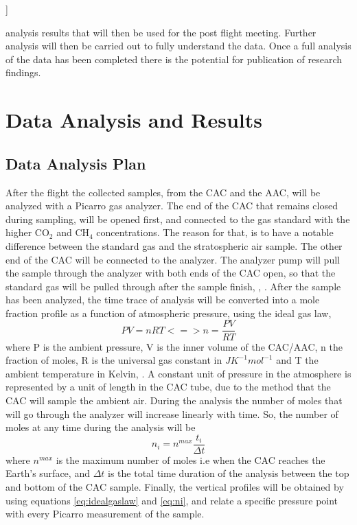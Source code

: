 ]\documentclass[a4paper,12pt,twoside]{article}
\providecommand{\DIFaddtex}[1]{{\protect\color{blue}\uwave{#1}}} %
\providecommand{\DIFaddend}{} %
\providecommand{\DIFadd}[1]{\texorpdfstring{\DIFaddtex{#1}}{#1}} %
\DeclareRobustCommand{\DIFaddend}{\DIFOaddend \let\includegraphics\DIFOincludegraphics} %
\begin{document}
\DIFadd{The }\DIFaddend analysis results that will then be used for the post flight meeting. Further analysis will then be carried out to fully understand the data. Once a full analysis of the data has been completed there is the potential for publication of research findings.



\pagebreak
\section{Data Analysis and Results}

\subsection{Data Analysis Plan}

After the flight the collected samples, from the CAC and the AAC, will be analyzed with a Picarro gas analyzer. The end of the CAC that remains closed during sampling, will be opened first, and connected to the gas standard with the higher CO$_2$ and CH$_4$ concentrations. The reason for that, is to have a notable difference between the standard gas and the stratospheric air sample. The other end of the CAC will be connected to the analyzer. The analyzer pump will pull the sample through the analyzer with both ends of the CAC open, so that the standard gas will be pulled through after the sample finish, \cite{Karion}, \cite{Olivier}.
After the sample has been analyzed, the time trace of analysis will be converted into a mole fraction profile as a function of atmospheric pressure, using the ideal gas law,
\begin{equation}
    PV = nRT <=> n = \frac{PV}{RT}
    \label{eq:idealgaslaw}
\end{equation}
where P is the ambient pressure, V is the inner volume of the CAC/AAC, n the fraction of moles, R is the universal gas constant in $J K^{-1} mol^{-1}$ and T the ambient temperature in Kelvin, \cite{Olivier}. 
A constant unit of pressure in the atmosphere is represented by a unit of length in the CAC tube, due to the method that the CAC will sample the ambient air.
During the analysis the number of moles that will go through the analyzer will increase linearly with time. So, the number of moles at any time during the analysis will be
\begin{equation}
    n_i = n^{max}\frac{t_i}{\Delta t}
    \label{eq:ni}
\end{equation}
where $n^{max}$ is the maximum number of moles i.e when the CAC reaches the Earth's surface, and $\Delta t$  is the total time duration of the analysis between the top and bottom of the CAC sample.   
Finally, the vertical profiles will be obtained by using equations \ref{eq:idealgaslaw} and \ref{eq:ni}, and relate a specific pressure point with every Picarro measurement of the sample.   
\end{document}
